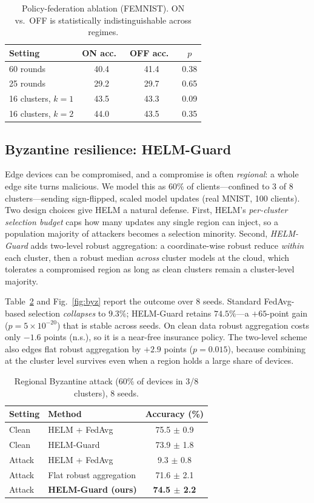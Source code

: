 \documentclass[conference]{IEEEtran}
\begin{document}
\begin{table}[t]
\caption{Policy-federation ablation (FEMNIST). ON vs.\ OFF is statistically
indistinguishable across regimes.}
\label{tab:abl}
\centering
\small
\begin{tabular}{lccc}
\toprule
Setting & ON acc.\ & OFF acc.\ & $p$ \\
\midrule
60 rounds & 40.4 & 41.4 & 0.38 \\
25 rounds & 29.2 & 29.7 & 0.65 \\
16 clusters, $k{=}1$ & 43.5 & 43.3 & 0.09 \\
16 clusters, $k{=}2$ & 44.0 & 43.5 & 0.35 \\
\bottomrule
\end{tabular}
\end{table}

\subsection{Byzantine resilience: HELM-Guard}
\label{sec:byz}
Edge devices can be compromised, and a compromise is often \emph{regional}: a
whole edge site turns malicious. We model this as $60\%$ of clients---confined to
3 of 8 clusters---sending sign-flipped, scaled model updates (real MNIST, 100
clients). Two design choices give HELM a natural defense. First, HELM's
\emph{per-cluster selection budget} caps how many updates any single region can
inject, so a population majority of attackers becomes a selection minority.
Second, \emph{HELM-Guard} adds two-level robust aggregation: a coordinate-wise
robust reduce \emph{within} each cluster, then a robust median \emph{across}
cluster models at the cloud, which tolerates a compromised region as long as clean
clusters remain a cluster-level majority.

Table~\ref{tab:byz} and Fig.~\ref{fig:byz} report the outcome over 8 seeds.
Standard FedAvg-based selection \emph{collapses} to $9.3\%$; HELM-Guard retains
$74.5\%$---a $+65$-point gain ($p{=}5{\times}10^{-20}$) that is stable across seeds.
On clean data robust aggregation costs only $-1.6$ points (n.s.), so it is a
near-free insurance policy. The two-level scheme also edges flat robust
aggregation by $+2.9$ points ($p{=}0.015$), because combining at the cluster level
survives even when a region holds a large share of devices.

\begin{table}[t]
\caption{Regional Byzantine attack (60\% of devices in 3/8 clusters), 8 seeds.}
\label{tab:byz}
\centering
\small
\begin{tabular}{llc}
\toprule
Setting & Method & Accuracy (\%) \\
\midrule
Clean & HELM + FedAvg & 75.5 $\pm$ 0.9 \\
Clean & HELM-Guard & 73.9 $\pm$ 1.8 \\
\midrule
Attack & HELM + FedAvg & 9.3 $\pm$ 0.8 \\
Attack & Flat robust aggregation & 71.6 $\pm$ 2.1 \\
Attack & \textbf{HELM-Guard (ours)} & \textbf{74.5 $\pm$ 2.2} \\
\bottomrule
\end{tabular}
\end{table}
\end{document}
